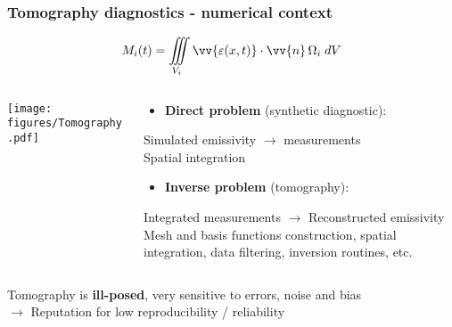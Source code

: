 \documentclass[10pt]{beamer}
\begin{document}
\begin{frame}
\frametitle{Tomography diagnostics - numerical context}

    $$M_i(t) = \iiint\limits_{V_i} \vv{\varepsilon(x,t)}\cdot\vv{n} \,\Omega_i \;{d}V$$
    \vspace{-1cm}
\begin{columns}
	\begin{column}{0.325\textwidth}

	\texttt{[image: figures/Tomography.pdf]}

	\end{column}

	\begin{column}{0.675\textwidth}
	\begin{center}

	\begin{block}{}
	\begin{itemize}
	\item \textcolor{myblue}{\textbf{Direct problem} (synthetic diagnostic):\\
	}
	\end{itemize}
	\end{block}
Simulated emissivity $\longrightarrow$ measurements\\
	\alert{Spatial integration}
    \vspace{-0.5cm}

	\begin{block}{}
	\begin{itemize}
	\item \textcolor{myblue}{\textbf{Inverse problem} (tomography):\\
	}
	\end{itemize}
	\end{block}
Integrated measurements $\longrightarrow$ Reconstructed emissivity \\
	 \alert{Mesh and basis functions construction, spatial integration, data filtering, inversion routines, etc.}

	\end{center}

	\end{column}
%
\end{columns}

\pause
\vspace{-0.5cm}
\begin{block}{}
\begin{center}
Tomography is \textbf{ill-posed}, very sensitive to errors, noise and bias\\
$\longrightarrow$  \alert{Reputation for low reproducibility / reliability }
\end{center}
	\end{block}
\end{frame}
\end{document}
